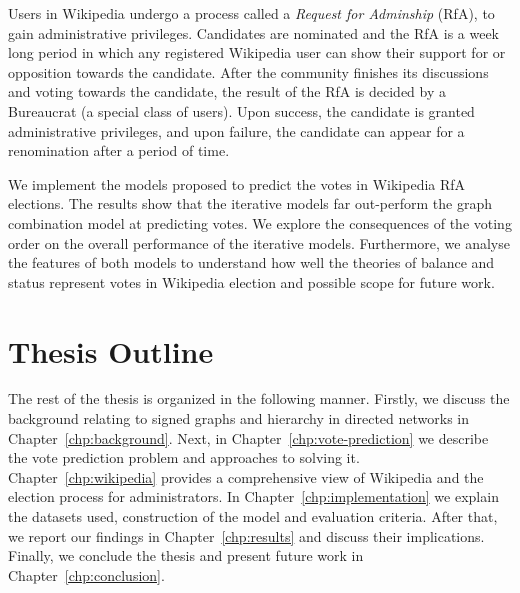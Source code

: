 Users in Wikipedia undergo a process called a \textit{Request for Adminship} (RfA), to gain administrative privileges.
Candidates are nominated and the RfA is a week long period in which any registered Wikipedia user can show their support for or opposition towards the candidate.
After the community finishes its discussions and voting towards the candidate, the result of the RfA is decided by a Bureaucrat (a special class of users).
Upon success, the candidate is granted administrative privileges, and upon failure, the candidate can appear for a renomination after a period of time.

We implement the models proposed to predict the votes in Wikipedia RfA elections.
The results show that the iterative models far out-perform the graph combination model at predicting votes.
We explore the consequences of the voting order on the overall performance of the iterative models.
Furthermore, we analyse the features of both models to understand how well the theories of balance and status represent votes in Wikipedia election and possible scope for future work.

\section{Thesis Outline}
The rest of the thesis is organized in the following manner. Firstly, we discuss the background relating to signed graphs and hierarchy in directed networks in Chapter~\ref{chp:background}. Next, in Chapter~\ref{chp:vote-prediction} we describe the vote prediction problem and approaches to solving it. Chapter~\ref{chp:wikipedia} provides a comprehensive view of Wikipedia and the election process for administrators. In Chapter~\ref{chp:implementation} we explain the datasets used, construction of the model and evaluation criteria. After that, we report our findings in Chapter~\ref{chp:results} and discuss their implications. Finally, we conclude the thesis and present future work in Chapter~\ref{chp:conclusion}.